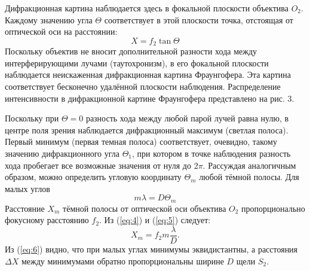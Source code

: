 \documentclass[a4paper, 12pt]{article}
\begin{document}
	Дифракционная картина наблюдается здесь в фокальной плоскости объектива $O_2$. Каждому значению угла $\Theta$ соответствует в этой плоскости точка, отстоящая от оптической оси на расстоянии:
	\begin{equation}
		X=f_2\tan\Theta
		\label{eq:4}
	\end{equation}
	Поскольку объектив не вносит дополнительной разности хода между интерферирующими лучами (таутохронизм), в его фокальной плоскости наблюдается неискаженная дифракционная картина Фраунгофера. Эта картина соответствует бесконечно удалённой плоскости наблюдения. Распределение интенсивности в дифракционной картине Фраунгофера представлено на рис. 3.\par
	Поскольку при $\Theta=0$ разность хода между любой парой лучей равна нулю, в центре поля зрения наблюдается дифракционный максимум (светлая полоса). Первый минимум (первая темная полоса) соответствует, очевидно, такому значению дифракционного угла $\Theta_1$, при котором в точке наблюдения разность хода пробегает все возможные значения от нуля до $2\pi$. Рассуждая аналогичным образом, можно определить угловую координату $\Theta_m$ любой тёмной полосы. Для малых углов
	\begin{equation}
		m\lambda=D\Theta_m
		\label{eq:5}
	\end{equation}
	Расстояние $X_m$ тёмной полосы от оптической оси объектива $O_2$ пропорционально фокусному расстоянию $f_2$. Из (\ref{eq:4}) и (\ref{eq:5}) следует:
	\begin{equation}
		X_m=f_2m\frac{\lambda}{D}.
		\label{eq:6}
	\end{equation}
	Из (\ref{eq:6}) видно, что при малых углах минимумы эквидистантны, а расстояния $\Delta X$ между минимумами обратно пропорциональны ширине $D$ щели $S_2$.
\end{document}
